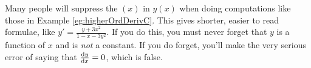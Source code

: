 \begin{warning}\label{warning:dropx}
Many people will suppress the $(x)$ in $y(x)$ when doing
computations like those in Example \ref{eg:higherOrdDerivC}.
This gives shorter, easier to read formulae, like
$y'=\frac{y+3x^2}{1-x-3y^2}$. If you do this, you must never forget
that $y$ is a function of $x$ and is \emph{not} a constant. If you do forget,
you'll make the very serious error of saying that $\diff{y}{x}=0$,
which is false.

\end{warning}

